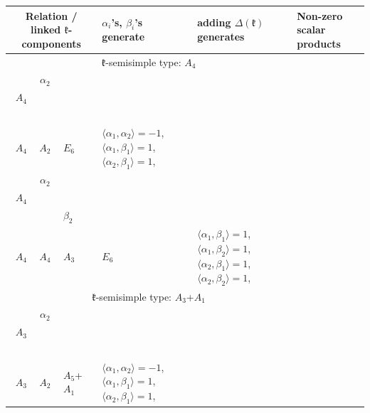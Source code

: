 \documentclass[12pt]{report}
\begin{document}
\begin{appendix}
{\begin{longtable}{rcl p{1cm}p{1cm}p{3cm} } \multicolumn{3}{c}{ Relation / linked $\mathfrak{k}$-components} &$\alpha_i$'s, $\beta_i$'s generate & adding $\Delta(\mathfrak{k})$ generates&Non-zero scalar products\\\hline\multicolumn{5}{c}{$\mathfrak{k}$-semisimple type: $A_4$}\\
\hline\hline\begin{tabular}{cc}$\alpha_1$+ & $\alpha_2$\\\tiny{ $A_4$ } & \tiny{  }\end{tabular} &\begin{tabular}{c} = \\~ \end{tabular} & \begin{tabular}{c}$\beta_1$\\\tiny{ $A_4$ }\end{tabular} & $A_2$ & $E_6$ & $\langle\alpha_1, \alpha_2\rangle=-1$,  $\langle\alpha_1, \beta_1\rangle=1$, $\langle\alpha_2, \beta_1\rangle=1$, 
\\
\begin{tabular}{cc}$\alpha_1$+ & $\alpha_2$\\\tiny{ $A_4$ } & \tiny{  }\end{tabular} &\begin{tabular}{c} = \\~ \end{tabular} & \begin{tabular}{cc}$\beta_1$+ & $\beta_2$\\\tiny{ $A_4$ } & \tiny{ $A_4$ }\end{tabular} & $A_3$ & $E_6$ &  $\langle\alpha_1, \beta_1\rangle=1$, $\langle\alpha_1, \beta_2\rangle=1$, $\langle\alpha_2, \beta_1\rangle=1$, $\langle\alpha_2, \beta_2\rangle=1$, 
\\
\hline\multicolumn{5}{c}{$\mathfrak{k}$-semisimple type: $A_3$+$A_1$}\\
\hline\hline\begin{tabular}{cc}$\alpha_1$+ & $\alpha_2$\\\tiny{ $A_3$ } & \tiny{  }\end{tabular} &\begin{tabular}{c} = \\~ \end{tabular} & \begin{tabular}{c}$\beta_1$\\\tiny{ $A_3$ }\end{tabular} & $A_2$ & $A_5$+$A_1$ & $\langle\alpha_1, \alpha_2\rangle=-1$,  $\langle\alpha_1, \beta_1\rangle=1$, $\langle\alpha_2, \beta_1\rangle=1$, 

\end{longtable}}
\end{appendix}
\end{document}
